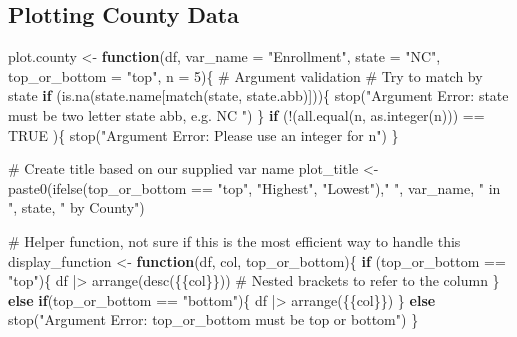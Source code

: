 \documentclass[
  letterpaper,
  DIV=11,
  numbers=noendperiod]{scrartcl}
\newenvironment{Shaded}{\begin{snugshade}}{\end{snugshade}}
\newcommand{\AttributeTok}[1]{\textcolor[rgb]{0.40,0.45,0.13}{#1}}
\newcommand{\CommentTok}[1]{\textcolor[rgb]{0.37,0.37,0.37}{#1}}
\newcommand{\ConstantTok}[1]{\textcolor[rgb]{0.56,0.35,0.01}{#1}}
\newcommand{\ControlFlowTok}[1]{\textcolor[rgb]{0.00,0.23,0.31}{\textbf{#1}}}
\newcommand{\DecValTok}[1]{\textcolor[rgb]{0.68,0.00,0.00}{#1}}
\newcommand{\FunctionTok}[1]{\textcolor[rgb]{0.28,0.35,0.67}{#1}}
\newcommand{\NormalTok}[1]{\textcolor[rgb]{0.00,0.23,0.31}{#1}}
\newcommand{\OtherTok}[1]{\textcolor[rgb]{0.00,0.23,0.31}{#1}}
\newcommand{\SpecialCharTok}[1]{\textcolor[rgb]{0.37,0.37,0.37}{#1}}
\newcommand{\StringTok}[1]{\textcolor[rgb]{0.13,0.47,0.30}{#1}}
\begin{document}
\subsection{Plotting County Data}\label{plotting-county-data}

\begin{Shaded}
\begin{Highlighting}[]
\NormalTok{plot.county }\OtherTok{\textless{}{-}} \ControlFlowTok{function}\NormalTok{(df, }\AttributeTok{var\_name =} \StringTok{"Enrollment"}\NormalTok{, }
                        \AttributeTok{state =} \StringTok{"NC"}\NormalTok{, }
                        \AttributeTok{top\_or\_bottom =} \StringTok{"top"}\NormalTok{, }\AttributeTok{n =} \DecValTok{5}\NormalTok{)\{}
  \CommentTok{\# Argument validation}
  \CommentTok{\# Try to match by state}
  \ControlFlowTok{if}\NormalTok{ (}\FunctionTok{is.na}\NormalTok{(state.name[}\FunctionTok{match}\NormalTok{(state, state.abb)]))\{}
    \FunctionTok{stop}\NormalTok{(}\StringTok{"Argument Error: state must be two letter state abb, e.g. \textquotesingle{}NC\textquotesingle{} "}\NormalTok{)}
\NormalTok{  \}}
  \ControlFlowTok{if}\NormalTok{ (}\SpecialCharTok{!}\NormalTok{(}\FunctionTok{all.equal}\NormalTok{(n, }\FunctionTok{as.integer}\NormalTok{(n))) }\SpecialCharTok{==} \ConstantTok{TRUE}\NormalTok{ )\{}
    \FunctionTok{stop}\NormalTok{(}\StringTok{"Argument Error: Please use an integer for n"}\NormalTok{)}
\NormalTok{  \}}

  
  \CommentTok{\# Create title based on our supplied var name}
\NormalTok{  plot\_title }\OtherTok{\textless{}{-}} \FunctionTok{paste0}\NormalTok{(}\FunctionTok{ifelse}\NormalTok{(top\_or\_bottom }\SpecialCharTok{==} \StringTok{"top"}\NormalTok{, }\StringTok{"Highest"}\NormalTok{, }\StringTok{"Lowest"}\NormalTok{),}\StringTok{" "}\NormalTok{, }
\NormalTok{                       var\_name, }\StringTok{" in "}\NormalTok{, state, }\StringTok{" by County"}\NormalTok{)}
  
  \CommentTok{\# Helper function, not sure if this is the most efficient way to handle this}
\NormalTok{  display\_function }\OtherTok{\textless{}{-}} \ControlFlowTok{function}\NormalTok{(df, col, top\_or\_bottom)\{}
    \ControlFlowTok{if}\NormalTok{ (top\_or\_bottom }\SpecialCharTok{==} \StringTok{"top"}\NormalTok{)\{}
\NormalTok{      df }\SpecialCharTok{|\textgreater{}} \FunctionTok{arrange}\NormalTok{(}\FunctionTok{desc}\NormalTok{(\{\{col\}\})) }\CommentTok{\# Nested brackets to refer to the column}
\NormalTok{    \}}
    \ControlFlowTok{else} \ControlFlowTok{if}\NormalTok{(top\_or\_bottom }\SpecialCharTok{==} \StringTok{"bottom"}\NormalTok{)\{}
\NormalTok{      df }\SpecialCharTok{|\textgreater{}} \FunctionTok{arrange}\NormalTok{(\{\{col\}\})}
\NormalTok{    \}}
    \ControlFlowTok{else}
      \FunctionTok{stop}\NormalTok{(}\StringTok{"Argument Error: top\_or\_bottom must be \textquotesingle{}top\textquotesingle{} or \textquotesingle{}bottom\textquotesingle{}"}\NormalTok{)}
\NormalTok{  \}}
  

\end{Highlighting}
\end{Shaded}
\end{document}
